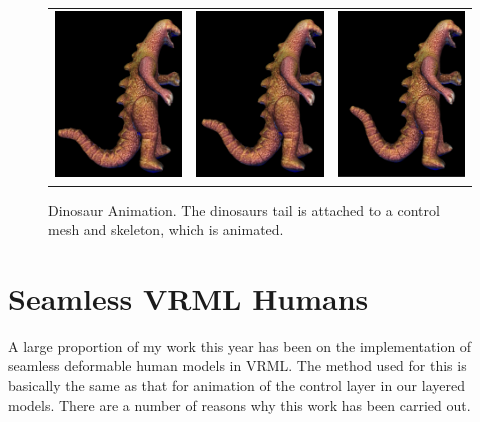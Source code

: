 \documentclass[10pt,oneside,fleqn,a4paper]{book}
\begin{document}
\begin{figure}
\begin{center}
\begin{tabular}{ccc}
\includegraphics[width=4.3cm]{../images/dino7} & \includegraphics[width=4.3cm]{../images/dino8} & \includegraphics[width=4.3cm]{../images/dino9} \\
\end{tabular}
\end{center}
\caption[Dinosaur Animation]{\label{fig:dino}Dinosaur Animation. The dinosaurs tail is attached to a control mesh and skeleton, which is animated.}
\end{figure}

\chapter{\label{ch:vrmlhumans}Seamless VRML Humans}
A large proportion of my work this year has been on the implementation of seamless deformable human models in VRML. The method used for this is basically the same as that for animation of the control layer in our layered models. There are a number of reasons why this work has been carried out.  
\end{document}
